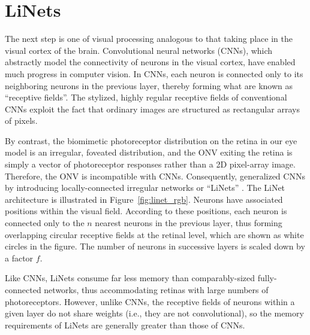 \documentclass [MS] {UCLAthesis}
\begin{document}
\section{LiNets}
\label{sec:LiNets}

The next step is one of visual processing analogous to that taking place in the visual cortex of the brain. Convolutional neural networks (CNNs), which abstractly model the connectivity of neurons in the visual cortex, have enabled much progress in computer vision. In CNNs, each neuron is connected only to its neighboring neurons in the previous layer, thereby forming what are known as ``receptive fields''. The stylized, highly regular receptive fields of conventional CNNs exploit the fact that ordinary images are structured as rectangular arrays of pixels. 

By contrast, the biomimetic photoreceptor distribution on the retina in our eye model is an irregular, foveated distribution, and the ONV exiting the retina is simply a vector of photoreceptor responses rather than a 2D pixel-array image. Therefore, the ONV is incompatible with CNNs. Consequently, \citet{Arjun} generalized CNNs by introducing locally-connected irregular networks or ``LiNets'' \citep{Masaki_linet}. The LiNet architecture is illustrated in Figure~\ref{fig:linet_rgb}. Neurons have associated positions within the visual field. According to these positions, each neuron is connected only to the $n$ nearest neurons in the previous layer, thus forming overlapping circular receptive fields at the retinal level, which are shown as white circles in the figure. The number of neurons in successive layers is scaled down by a factor $f$. 

Like CNNs, LiNets consume far less memory than comparably-sized fully-connected networks, thus accommodating retinas with large numbers of photoreceptors. However, unlike CNNs, the receptive fields of neurons within a given layer do not share weights (i.e., they are not convolutional), so the memory requirements of LiNets are generally greater than those of CNNs.

\end{document}
